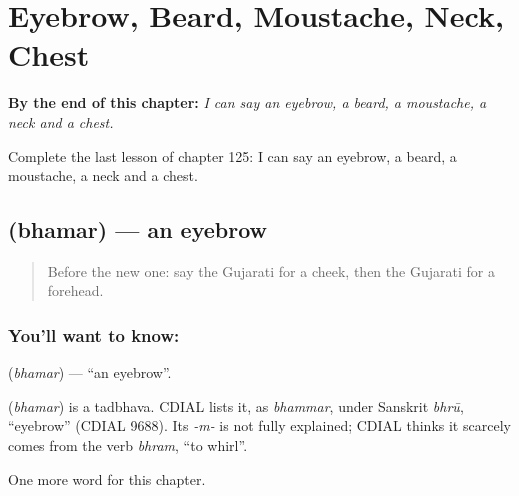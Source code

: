 
\chapter{Eyebrow, Beard, Moustache, Neck, Chest}
\label{ch:gu-eyebrow-beard-moustache-neck-chest}

\begin{chapteropening}
\textbf{By the end of this chapter:} \emph{I can say an eyebrow, a beard, a moustache, a neck and a chest.}

Complete the last lesson of chapter 125: I can say an eyebrow, a beard, a moustache, a neck and a chest.
\end{chapteropening}

\section[\texorpdfstring{\gu{ભમર} (bhamar)}{ભમર (bhamar)}]{ (bhamar) — an eyebrow}

\label{lesson:GU-C125-bhamar}



\begin{quote}
Before the new one: say the Gujarati for a cheek, then the Gujarati for a forehead.
\end{quote}

\subsection*{You'll want to know: }
\textbf{} (\emph{bhamar}) — \textquotedblleft{}an eyebrow\textquotedblright{}.

\begin{cousinweb}
\textbf{} (\emph{bhamar}) is a tadbhava. CDIAL lists it, as \emph{bhammar}, under Sanskrit \emph{bhrū}, \textquotedblleft{}eyebrow\textquotedblright{} (CDIAL 9688). Its \emph{-m-} is not fully explained; CDIAL thinks it scarcely comes from the verb \emph{bhram}, \textquotedblleft{}to whirl\textquotedblright{}.
\end{cousinweb}

\begin{grammarlens}[title={What you've built}]
One more word for this chapter.
\end{grammarlens}


